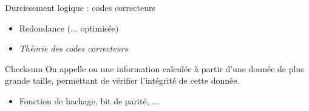 \documentclass[french,bookmarks,aspectratio=43]{beamer}
\begin{document}
\begin{frame}{Durcissement logique : codes correcteurs}
    \begin{itemize}
        \item Redondance \pause ($\dots$ optimisée)\pause

        \item \emph{Théorie des codes correcteurs}\pause
    \end{itemize}

    \begin{bdefinition}{Checksum}{}
        On appelle  ou  une information calculée à partir d'une donnée de plus grande taille, permettant de vérifier l'intégrité de cette donnée.
    \end{bdefinition}\pause

    \begin{itemize}
        \item Fonction de hachage, bit de parité, $\dots$
    \end{itemize}
\end{frame}
\end{document}
